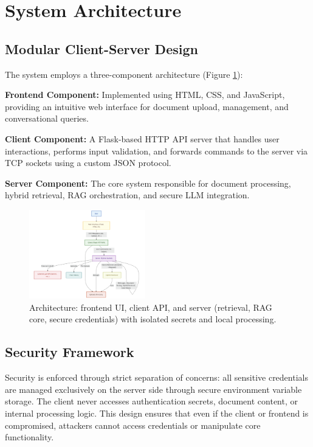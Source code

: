 \documentclass[conference]{IEEEtran}
\begin{document}
\section{System Architecture}

\subsection{Modular Client-Server Design}

The system employs a three-component architecture (Figure \ref{fig:architecture}):

\textbf{Frontend Component:} Implemented using HTML, CSS, and JavaScript, providing an intuitive web interface for document upload, management, and conversational queries.

\textbf{Client Component:} A Flask-based HTTP API server that handles user interactions, performs input validation, and forwards commands to the server via TCP sockets using a custom JSON protocol.

\textbf{Server Component:} The core system responsible for document processing, hybrid retrieval, RAG orchestration, and secure LLM integration.

\begin{figure}[htbp]
\centering
\begingroup
\captionsetup{font=small}
\includegraphics[width=0.45\textwidth]{images/architecture_simple_diagram.png}
\caption{Architecture: frontend UI, client API, and server (retrieval, RAG core, secure credentials) with isolated secrets and local processing.}
\label{fig:architecture}
\endgroup
\end{figure}

\subsection{Security Framework}

Security is enforced through strict separation of concerns: all sensitive credentials are managed exclusively on the server side through secure environment variable storage. The client never accesses authentication secrets, document content, or internal processing logic. This design ensures that even if the client or frontend is compromised, attackers cannot access credentials or manipulate core functionality.
\end{document}

